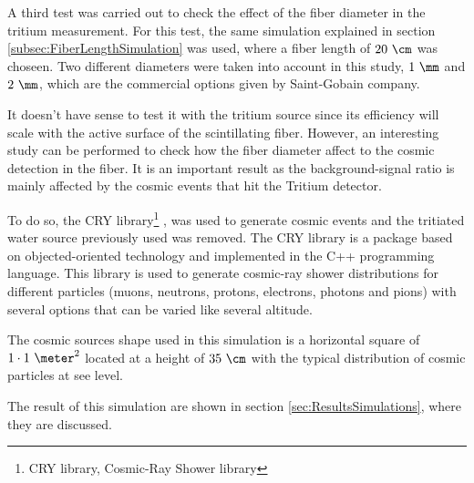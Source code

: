 A third test was carried out to check the effect of the fiber diameter in the tritium measurement. For this test, the same simulation explained in section \ref{subsec:FiberLengthSimulation} was used, where a fiber length of $20~\cm$ was choseen. Two different diameters were taken into account in this study, $1~\mm$ and $2~\mm$, which are the commercial options given by Saint-Gobain company.

It doesn't have sense to test it with the tritium source since its efficiency will scale with the active surface of the scintillating fiber. However, an interesting study can be performed to check how the fiber diameter affect to the cosmic detection in the fiber. It is an important result as the background-signal ratio is mainly affected by the cosmic events that hit the Tritium detector.

To do so, the CRY library\footnote{CRY library, Cosmic-Ray Shower library} \cite{CRYwebsite}, \cite{CRYpaper} was used to generate cosmic events and the tritiated water source previously used was removed. The CRY library is a package based on objected-oriented technology and implemented in the C++ programming language. This library is used to generate cosmic-ray shower distributions for different particles (muons, neutrons, protons, electrons, photons and pions) with several options that can be varied like several altitude.

The cosmic sources shape used in this simulation is a horizontal square of $1\cdot 1~\meter ^2$ located at a height of $35~\cm$ with the typical distribution of cosmic particles at see level.

The result of this simulation are shown in section \ref{sec:ResultsSimulations}, where they are discussed.